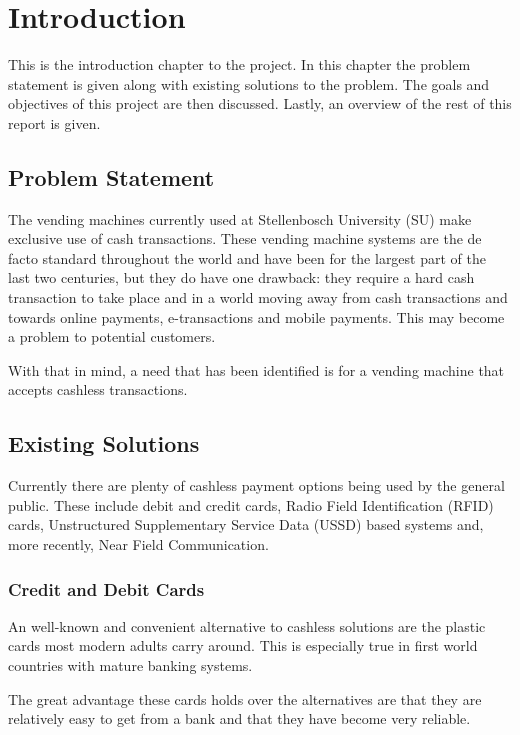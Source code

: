 \chapter{Introduction}

This is the introduction chapter to the project. In this chapter the problem statement is
given along with existing solutions to the problem. The goals and objectives of this project
are then discussed. Lastly, an overview of the rest of this report is given. 

\section{Problem Statement}

The vending machines currently used at Stellenbosch University (SU) make exclusive use of
cash transactions. These vending machine systems are the de facto standard throughout the
world and have been for the largest part of the last two centuries, but they do have one
drawback: they require a hard cash transaction to take place and in a world moving away from
cash transactions and towards online payments, e-transactions and mobile payments. This may
become a problem to potential customers.

With that in mind, a need that has been identified is for a vending machine that accepts
cashless transactions.

\section{Existing Solutions}

Currently there are plenty of cashless payment options being used by the general public. These
include debit and credit cards, Radio Field Identification (RFID) cards,
Unstructured Supplementary Service Data (USSD) based systems and, more recently, Near Field Communication.

\subsection{Credit and Debit Cards}

An well-known and convenient alternative to cashless solutions are the plastic cards most
modern adults carry around. This is especially true in first world countries with mature
banking systems. 

The great advantage these cards holds over the alternatives are that they are
relatively easy to get from a bank and that they have become very reliable. 

